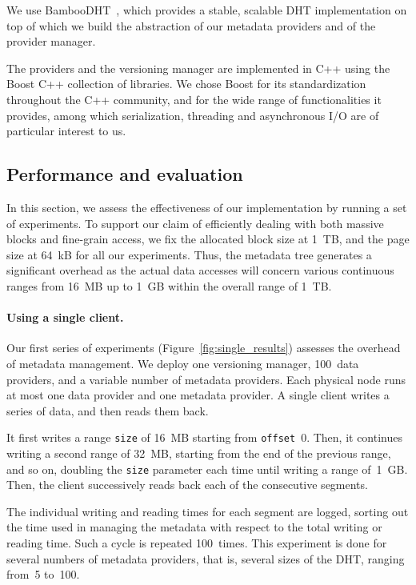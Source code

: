\documentclass{llncs}
\newcommand{\myblock}[1]{\mbox{\lstinline{#1}}}
\newcommand{\myblockxspace}[1]{\myblock{#1}\xspace}
\newcommand{\Offset}{\myblockxspace{offset}}
\newcommand{\Size}{\myblockxspace{size}}
\begin{document}
We use BambooDHT~\cite{RheGodKaretal05Bamboo}, which provides a stable, scalable DHT
implementation on top of which we build the abstraction of our
metadata providers and of the provider manager.

The providers and the versioning manager are implemented in C++ using
the Boost C++ collection of libraries. We chose Boost for its
standardization throughout the C++ community, and for the wide range
of functionalities it provides, among which serialization, threading
and asynchronous I/O are of particular interest to us.

\subsection{Performance and evaluation}

In this section, we assess the effectiveness of our implementation by
running a set of experiments. To support our claim of efficiently
dealing with both massive blocks and fine-grain access, we fix the
allocated block size at 1~TB, and the page size at 64~kB for all
our experiments. Thus, the metadata tree  generates a significant
overhead
as the actual data accesses will
concern various continuous ranges from 16~MB up to 1~GB within the
overall range of 1~TB.

\paragraph{Using a single client.}

Our first series of experiments (Figure~\ref{fig:single_results})
assesses the overhead of metadata management.  We deploy one
versioning manager, 100~data providers, and a variable number of
metadata providers.
Each physical node runs at most one data provider and one metadata provider.
A single client writes a series of data, and then reads them back.

It first writes a range \Size of 16~MB starting from \Offset~0. 
Then, it continues writing a second range of 32~MB, starting
from the end of the previous range, and so on, 
doubling the \Size parameter each time until
writing a range of~1~GB. Then, the client successively reads back each
of the consecutive segments. 

The individual writing and reading times
for each segment are logged, sorting out the time used in managing the
metadata with respect to the total writing or reading time. Such a
cycle is repeated 100~times. This experiment is done for several
numbers of metadata providers, that is, several sizes of the DHT,
ranging from~5 to~100. 
\end{document}
